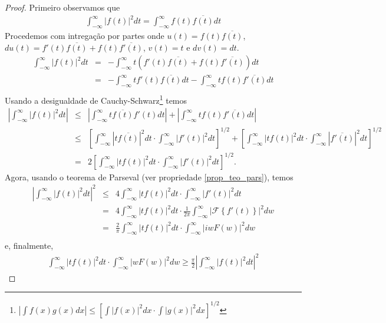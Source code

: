 \begin{proof}
Primeiro observamos que
\begin{eqnarray*}
\int_{-\infty}^\infty |f(t)|^2dt = \int_{-\infty}^\infty f(t) \overline{f(t)}dt
\end{eqnarray*}
Procedemos com intregação por partes onde $u(t)=f(t) \overline{f(t)}$, $du(t)=f'(t) \overline{f(t)}+f(t) \overline{f'(t)}$, $v(t)=t$ e $dv(t)=dt$.
\begin{eqnarray*}
\int_{-\infty}^\infty |f(t)|^2dt &=& -\int_{-\infty}^\infty t\left(f'(t) \overline{f(t)}+f(t) \overline{f'(t)}\right)dt\\
&=&-\int_{-\infty}^\infty tf'(t) \overline{f(t)}dt-\int_{-\infty}^\infty tf(t) \overline{f'(t)}dt\\
\end{eqnarray*}
Usando a desigualdade de Cauchy-Schwarz\footnote{$\left|\int f(x)g(x)dx\right|\leq \left[\int|f(x)|^2dx \cdot \int|g(x)|^2dx\right]^{1/2} $} temos
\begin{eqnarray*}
\left|\int_{-\infty}^\infty |f(t)|^2dt\right| &\leq &\left|\int_{-\infty}^\infty t \overline{f(t)} f'(t)dt\right|+\left|\int_{-\infty}^\infty tf(t) \overline{f'(t)}dt\right|\\
&\leq &\left[\int_{-\infty}^\infty  | t\overline{f(t)}|^2dt\cdot \int_{-\infty}^\infty  | f'(t)|^2dt\right]^{1/2}+\left[\int_{-\infty}^\infty  | tf(t)|^2dt\cdot \int_{-\infty}^\infty  | \overline{f'(t)}|^2dt\right]^{1/2}\\
&=&2\left[\int_{-\infty}^\infty  | tf(t)|^2dt\cdot \int_{-\infty}^\infty  | f'(t)|^2dt\right]^{1/2}.
\end{eqnarray*}
Agora, usando o teorema de Parseval (ver propriedade \ref{prop_teo_pars}), temos
\begin{eqnarray*}
\left|\int_{-\infty}^\infty |f(t)|^2dt\right|^2 &\leq & 4\int_{-\infty}^\infty  | tf(t)|^2dt\cdot \int_{-\infty}^\infty  | f'(t)|^2dt\\
&=&4\int_{-\infty}^\infty  | tf(t)|^2dt\cdot \frac{1}{2\pi}\int_{-\infty}^\infty \left|\mathcal{F}\left\{ f'(t)\right\}\right|^2dw\\
&=&\frac{2}{\pi}\int_{-\infty}^\infty  | tf(t)|^2dt\cdot \int_{-\infty}^\infty \left|iw F(w)\right|^2dw\\
\end{eqnarray*}
e, finalmente,
\begin{eqnarray*}
\int_{-\infty}^\infty  | tf(t)|^2dt\cdot \int_{-\infty}^\infty \left|w F(w)\right|^2dw \geq \frac{\pi}{2}
\left|\int_{-\infty}^\infty |f(t)|^2dt\right|^2 
\end{eqnarray*}
\end{proof}
